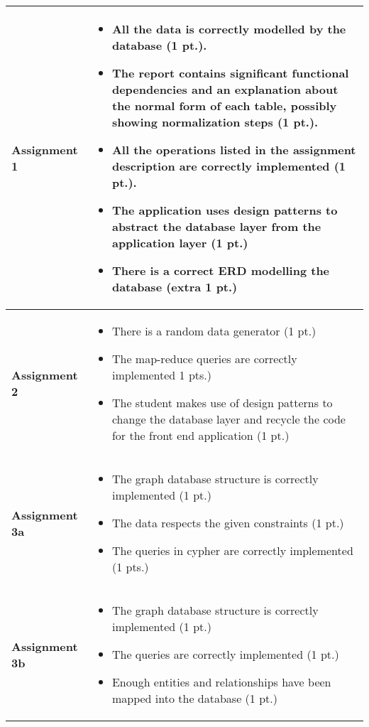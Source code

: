 		
		\begin{longtable}{|p{3cm}|p{8cm}|}
			\hline
			\textbf{Assignment 1} &
			\begin{itemize}
				\item All the data is correctly modelled by the database (1 pt.).
				\item The report contains significant functional dependencies and an explanation about the normal form of each table, possibly showing normalization steps (1 pt.).
				\item All the operations listed in the assignment description are correctly implemented (1 pt.).
				\item The application uses design patterns to abstract the database layer from the application layer (1 pt.)
				\item There is a correct ERD modelling the database (extra 1 pt.) 
			\end{itemize} \\
			\hline
			\textbf{Assignment 2} &
			\begin{itemize}
				\item There is a random data generator (1 pt.)
				\item The map-reduce queries are correctly implemented 1 pts.)
				\item The student makes use of design patterns to change the database layer and recycle the code for the front end application (1 pt.)
			\end{itemize} \\
			\hline
			\textbf{Assignment 3a} &
			\begin{itemize}
				\item The graph database structure is correctly implemented (1 pt.)
				\item The data respects the given constraints (1 pt.)
				\item The queries in cypher are correctly implemented (1 pts.)
			\end{itemize} \\
			\hline
			\textbf{Assignment 3b} &
			\begin{itemize}
				\item The graph database structure is correctly implemented (1 pt.)
				\item The queries are correctly implemented (1 pt.)
				\item Enough entities and relationships have been mapped into the database (1 pt.)
			\end{itemize}\\
			\hline
		\end{longtable}
